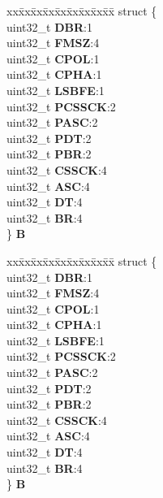 \begin{DoxyCompactItemize}
\begin{tabbing}
\end{tabbing}\item 
\mbox{\label{unionDSPI__tag_1_1DSPI__CTAR__tag_afec47476ec4524d719dc3163ff1a3be1}} 
\begin{tabbing}
xx\=xx\=xx\=xx\=xx\=xx\=xx\=xx\=xx\=\kill
struct \{\\
\>uint32\_t {\bfseries DBR}:1\\
\>uint32\_t {\bfseries FMSZ}:4\\
\>uint32\_t {\bfseries CPOL}:1\\
\>uint32\_t {\bfseries CPHA}:1\\
\>uint32\_t {\bfseries LSBFE}:1\\
\>uint32\_t {\bfseries PCSSCK}:2\\
\>uint32\_t {\bfseries PASC}:2\\
\>uint32\_t {\bfseries PDT}:2\\
\>uint32\_t {\bfseries PBR}:2\\
\>uint32\_t {\bfseries CSSCK}:4\\
\>uint32\_t {\bfseries ASC}:4\\
\>uint32\_t {\bfseries DT}:4\\
\>uint32\_t {\bfseries BR}:4\\
\} {\bfseries B}\\

\end{tabbing}\item 
\mbox{\label{unionDSPI__tag_1_1DSPI__CTAR__tag_a3da34e0f652537b1ab9258d7f28b1616}} 
\begin{tabbing}
xx\=xx\=xx\=xx\=xx\=xx\=xx\=xx\=xx\=\kill
struct \{\\
\>uint32\_t {\bfseries DBR}:1\\
\>uint32\_t {\bfseries FMSZ}:4\\
\>uint32\_t {\bfseries CPOL}:1\\
\>uint32\_t {\bfseries CPHA}:1\\
\>uint32\_t {\bfseries LSBFE}:1\\
\>uint32\_t {\bfseries PCSSCK}:2\\
\>uint32\_t {\bfseries PASC}:2\\
\>uint32\_t {\bfseries PDT}:2\\
\>uint32\_t {\bfseries PBR}:2\\
\>uint32\_t {\bfseries CSSCK}:4\\
\>uint32\_t {\bfseries ASC}:4\\
\>uint32\_t {\bfseries DT}:4\\
\>uint32\_t {\bfseries BR}:4\\
\} {\bfseries B}\\

\end{tabbing}\end{DoxyCompactItemize}


